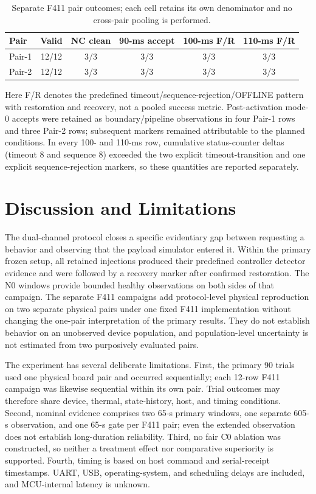 \documentclass[conference]{IEEEtran}
\begin{document}
\begin{table}[t]
\caption{Separate F411 pair outcomes; each cell retains its own denominator and no cross-pair pooling is performed.}
\label{tab:f411}
\centering
\scriptsize
\begin{tabular}{lccccc}
\toprule
Pair & Valid & NC clean & 90-ms accept & 100-ms F/R & 110-ms F/R \\
\midrule
Pair-1 & 12/12 & 3/3 & 3/3 & 3/3 & 3/3 \\
Pair-2 & 12/12 & 3/3 & 3/3 & 3/3 & 3/3 \\
\bottomrule
\end{tabular}
\end{table}

Here F/R denotes the predefined timeout/sequence-rejection/OFFLINE pattern with restoration and recovery, not a pooled success metric. Post-activation mode-0 accepts were retained as boundary/pipeline observations in four Pair-1 rows and three Pair-2 rows; subsequent markers remained attributable to the planned conditions. In every 100- and 110-ms row, cumulative status-counter deltas (timeout 8 and sequence 8) exceeded the two explicit timeout-transition and one explicit sequence-rejection markers, so these quantities are reported separately.

\section{Discussion and Limitations}

The dual-channel protocol closes a specific evidentiary gap between requesting a behavior and observing that the payload simulator entered it. Within the primary frozen setup, all retained injections produced their predefined controller detector evidence and were followed by a recovery marker after confirmed restoration. The N0 windows provide bounded healthy observations on both sides of that campaign. The separate F411 campaigns add protocol-level physical reproduction on two separate physical pairs under one fixed F411 implementation without changing the one-pair interpretation of the primary results. They do not establish behavior on an unobserved device population, and population-level uncertainty is not estimated from two purposively evaluated pairs.

The experiment has several deliberate limitations. First, the primary 90 trials used one physical board pair and occurred sequentially; each 12-row F411 campaign was likewise sequential within its own pair. Trial outcomes may therefore share device, thermal, state-history, host, and timing conditions. Second, nominal evidence comprises two 65-s primary windows, one separate 605-s observation, and one 65-s gate per F411 pair; even the extended observation does not establish long-duration reliability. Third, no fair C0 ablation was constructed, so neither a treatment effect nor comparative superiority is supported. Fourth, timing is based on host command and serial-receipt timestamps. UART, USB, operating-system, and scheduling delays are included, and MCU-internal latency is unknown.
\end{document}
